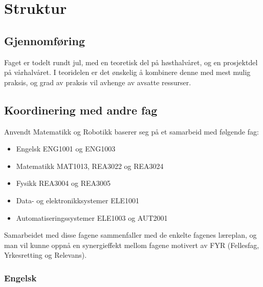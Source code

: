 \section*{Struktur} \label{Sec: Struktur}

	\subsection*{Gjennomføring}

	Faget er todelt rundt jul, med en teoretisk del på høsthalvåret, og en prosjektdel på vårhalvåret. I teoridelen er det ønskelig å kombinere denne med mest mulig praksis, og grad av praksis vil avhenge av avsatte ressurser.


	\subsection*{Koordinering med andre fag}

	Anvendt Matematikk og Robotikk baserer seg på et samarbeid med følgende fag:

	\begin{itemize}
	\item Engelsk ENG1001 og ENG1003
	\item Matematikk MAT1013, REA3022 og REA3024
	\item Fysikk REA3004 og REA3005
	\item Data- og elektronikksystemer ELE1001
	\item Automatiseringssystemer ELE1003 og AUT2001
	\end{itemize}

	Samarbeidet med disse fagene sammenfaller med de enkelte fagenes læreplan,
	og man vil kunne oppnå en synergieffekt mellom fagene motivert av FYR (Fellesfag, Yrkesretting og Relevans).\\


	\subsubsection*{Engelsk}

